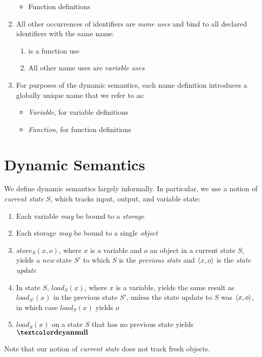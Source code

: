 \begin{enumerate}
\begin{itemize}
    \item Function definitions
    \end{itemize}
  \item All other occurrences of identifiers are \emph{name uses} and bind to all declared identifiers with the same name:
    \begin{enumerate}
    \item {} is a function use
    \item All other name uses are \emph{variable uses}
    \end{enumerate}
  \item For purposes of the dynamic semantics, each name definition introduces a globally unique name that we refer to as:
    \begin{itemize}
    \item \emph{Variable}, for variable definitions
    \item \emph{Function}, for function definitions
    \end{itemize}
\end{enumerate}

\section{Dynamic Semantics}

We define dynamic semantics largely informally.  In particular, we use
a notion of \emph{current state} $S$, which tracks input, output, and variable state:
\begin{enumerate}
\item Each variable \emph{may} be bound to a \emph{storage}
\item Each storage \emph{may} be bound to a single \emph{object}
\item $\textit{store}_S(x, o)$, where $x$ is a variable and $o$ an object in a current state $S$, yields a \emph{new} state $S'$ to which $S$ is the \emph{previous state} and $\langle x,o \rangle$ is the \emph{state update}
\item In state $S$, $\textit{load}_S(x)$, where $x$ is a variable, yields the same result as $\textit{load}_{S'}(x)$ in the previous state $S'$, unless the state update to $S$ was $\langle x, o \rangle$, in which case $\textit{load}_{S}(x)$ yields $o$
\item $\textit{load}_S(x)$ on a state $S$ that has no previous state yields $\Vnull$
\end{enumerate}
Note that our notion of \emph{current state} does not track fresh objects.


